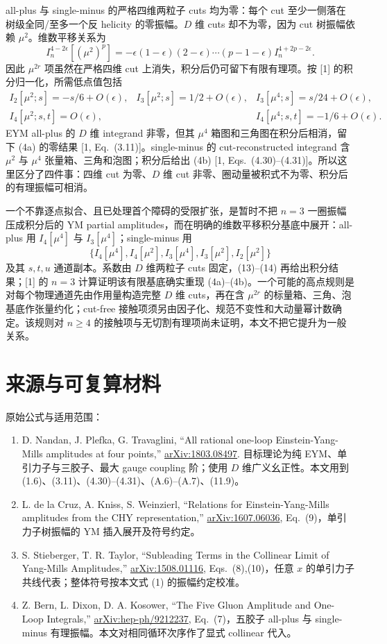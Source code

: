 \documentclass[UTF8,11pt]{ctexart}
\newcommand{\eps}{\epsilon}
\begin{document}
all-plus 与 single-minus 的严格四维两粒子 cuts 均为零：每个 cut 至少一侧落在树级全同/至多一个反 helicity 的零振幅。$D$ 维 cuts 却不为零，因为 cut 树振幅依赖 $\mu^2$。维数平移关系为
\[
I_n^{4-2\eps}[(\mu^2)^p]
=-\eps(1-\eps)(2-\eps)\cdots(p-1-\eps)
 I_n^{4+2p-2\eps}.
\tag{13}
\]
因此 $\mu^{2r}$ 项虽然在严格四维 cut 上消失，积分后仍可留下有限有理项。按 [1] 的积分归一化，所需低点值包括
\[
\begin{array}{lll}
I_2[\mu^2;s]=-s/6+O(\eps),& I_3[\mu^2;s]=1/2+O(\eps),&I_3[\mu^4;s]=s/24+O(\eps),\\
I_4[\mu^2;s,t]=O(\eps),&&I_4[\mu^4;s,t]=-1/6+O(\eps).
\end{array}
\tag{14}
\]
EYM all-plus 的 $D$ 维 integrand 非零，但其 $\mu^4$ 箱图和三角图在积分后相消，留下 (4a) 的零结果 [1, Eq.~(3.11)]。single-minus 的 cut-reconstructed integrand 含 $\mu^2$ 与 $\mu^4$ 张量箱、三角和泡图；积分后给出 (4b) [1, Eqs.~(4.30)--(4.31)]。所以这里区分了四件事：四维 cut 为零、$D$ 维 cut 非零、圈动量被积式不为零、积分后的有理振幅可相消。

一个不靠逐点拟合、且已处理首个障碍的受限扩张，是暂时不把 $n=3$ 一圈振幅压成积分后的 YM partial amplitudes，而在明确的维数平移积分基底中展开：all-plus 用 $I_4[\mu^4]$ 与 $I_3[\mu^4]$；single-minus 用
\[
\{I_4[\mu^4],I_4[\mu^2],I_3[\mu^4],I_3[\mu^2],I_2[\mu^2]\}
\]
及其 $s,t,u$ 通道副本。系数由 $D$ 维两粒子 cuts 固定，(13)--(14) 再给出积分结果；[1] 的 $n=3$ 计算证明该有限基底确实重现 (4a)--(4b)。一个可能的高点规则是对每个物理通道先由作用量构造完整 $D$ 维 cuts，再在含 $\mu^{2r}$ 的标量箱、三角、泡基底作张量约化；cut-free 接触项须另由因子化、规范不变性和大动量幂计数确定。该规则对 $n\ge4$ 的接触项与无切割有理项尚未证明，本文不把它提升为一般关系。

\section{来源与可复算材料}
原始公式与适用范围：
\begin{enumerate}
\item D. Nandan, J. Plefka, G. Travaglini, “All rational one-loop Einstein-Yang-Mills amplitudes at four points,” \href{https://arxiv.org/abs/1803.08497}{arXiv:1803.08497}. 目标理论为纯 EYM、单引力子与三胶子、最大 gauge coupling 阶；使用 $D$ 维广义幺正性。本文用到 (1.6)、(3.11)、(4.30)--(4.31)、(A.6)--(A.7)、(11.9)。
\item L. de la Cruz, A. Kniss, S. Weinzierl, “Relations for Einstein-Yang-Mills amplitudes from the CHY representation,” \href{https://arxiv.org/abs/1607.06036}{arXiv:1607.06036}, Eq.~(9)，单引力子树振幅的 YM 插入展开及符号约定。
\item S. Stieberger, T. R. Taylor, “Subleading Terms in the Collinear Limit of Yang-Mills Amplitudes,” \href{https://arxiv.org/abs/1508.01116}{arXiv:1508.01116}, Eqs.~(8),(10)，任意 $x$ 的单引力子共线代表；整体符号按本文式 (1) 的振幅约定校准。
\item Z. Bern, L. Dixon, D. A. Kosower, “The Five Gluon Amplitude and One-Loop Integrals,” \href{https://arxiv.org/abs/hep-ph/9212237}{arXiv:hep-ph/9212237}, Eq.~(7)，五胶子 all-plus 与 single-minus 有理振幅。本文对相同循环次序作了显式 collinear 代入。
\end{enumerate}
\end{document}
